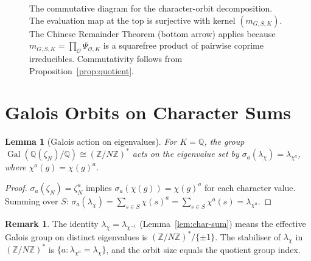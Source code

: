 \documentclass[12pt]{amsart}
\numberwithin{equation}{section}
\theoremstyle{plain}
\newtheorem{lemma}[theorem]{Lemma}
\theoremstyle{definition}
\newtheorem{remark}[theorem]{Remark}
\DeclareMathOperator{\Gal}{Gal}
\DeclareMathOperator{\Cay}{Cay}
\newcommand{\Z}{\mathbb{Z}}
\newcommand{\Q}{\mathbb{Q}}
\newcommand{\calA}{\mathcal{A}}
\newcommand{\calO}{\mathcal{O}}
\begin{document}
\begin{figure}[ht]
\centering
{}
\caption{The commutative diagram for the character-orbit decomposition.
  The evaluation map at the top is surjective with kernel $(m_{G,S,K})$.
  The Chinese Remainder Theorem (bottom arrow) applies because
  $m_{G,S,K} = \prod_{\calO} \Psi_{\calO,K}$ is a squarefree product of
  pairwise coprime irreducibles.  Commutativity follows from
  Proposition~\ref{prop:quotient}.}
\label{fig:cd}
\end{figure}

\section{Galois Orbits on Character Sums}
\label{sec:orbits}

\begin{lemma}[Galois action on eigenvalues]
\label{lem:galois-action}
For $K = \Q$, the group $\Gal(\Q(\zeta_N)/\Q) \cong (\Z/N\Z)^*$ acts on
the eigenvalue set by $\sigma_a(\lambda_\chi) = \lambda_{\chi^a}$, where
$\chi^a(g) = \chi(g)^a$.
\end{lemma}

\begin{proof}
$\sigma_a(\zeta_N) = \zeta_N^a$ implies $\sigma_a(\chi(g)) = \chi(g)^a$
for each character value.  Summing over $S$:
$\sigma_a(\lambda_\chi) = \sum_{s \in S} \chi(s)^a
= \sum_{s \in S} \chi^a(s) = \lambda_{\chi^a}$.
\end{proof}

\begin{remark}
The identity $\lambda_\chi = \lambda_{\chi^{-1}}$ (Lemma~\ref{lem:char-sum})
means the effective Galois group on distinct eigenvalues is
$(\Z/N\Z)^*/\{\pm 1\}$.  The stabiliser of $\lambda_\chi$ in
$(\Z/N\Z)^*$ is $\{a : \lambda_{\chi^a} = \lambda_\chi\}$, and the orbit
size equals the quotient group index.
\end{remark}
\end{document}
